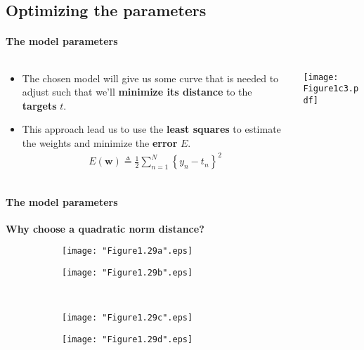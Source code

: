 \subsection{Optimizing the parameters}
\begin{frame}{\insertsubsection}
	\framesubtitle{The model parameters}
\begin{columns}
\begin{column}{0.475\textwidth}
	\begin{itemize}
		\item The chosen model will give us some curve that is needed to adjust such that we'll \textcolor{UniOrange}{\textbf{minimize its distance}} to the \textcolor{UniOrange}{\textbf{targets}} $t$.
		\item This approach lead us to use the \textcolor{UniOrange}{\textbf{least squares}} to estimate the weights and minimize the \textcolor{UniOrange}{\textbf{error}} $E$.
		\begin{align*}
			E(\mathbf{w}) \triangleq \frac{1}{2} \sum_{n=1}^N \left\{ y_n -  t_n \right\}^2
		\end{align*}
	\end{itemize}
\end{column}
\begin{column}{0.475\textwidth}  
    \begin{center}
	\centering
	\texttt{[image: Figure1c3.pdf]}
     \end{center}
\end{column}
\end{columns}

\end{frame}


\begin{frame}{\insertsubsection}
	\framesubtitle{The model parameters}
	\textcolor{UniGold}{\textbf{Why choose a quadratic norm distance?}}
	\begin{figure}
    \begin{subfigure}[t]{0.5\textwidth}
        \centering
        \texttt{[image: "Figure1.29a".eps]}
    \end{subfigure}%
    \begin{subfigure}[t]{0.5\textwidth}
        \centering
        \texttt{[image: "Figure1.29b".eps]}
		\end{subfigure}
		\\
	\begin{subfigure}[t]{0.5\textwidth}
		\centering
		\texttt{[image: "Figure1.29c".eps]}
	\end{subfigure}%
	\begin{subfigure}[t]{0.5\textwidth}
		\centering
		\texttt{[image: "Figure1.29d".eps]}
	\end{subfigure}
	\end{figure}
\end{frame}

